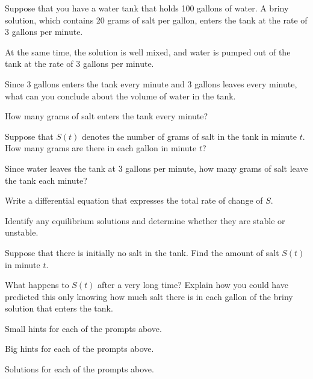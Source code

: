 \begin{activity} \label{A:7.4.salt}  
  Suppose that you have a water tank that holds 100 gallons of water.
  A briny solution, which contains 20 grams of salt per gallon, enters
  the tank at the rate of 3 gallons per minute.

  At the same time, the solution is well mixed, and water is pumped
  out of the tank at the rate of 3 gallons per minute.

\ba
\item Since 3 gallons enters the tank every minute and 3 gallons
  leaves every minute, what can you conclude about the volume of water
  in the tank.

\item How many grams of salt enters the tank every minute?

\item Suppose that $S(t)$ denotes the number of grams of salt in the
  tank in minute $t$.  How many grams are there in each gallon in
  minute $t$?

\item Since water leaves the tank at 3 gallons per minute, how many
  grams of salt leave the tank each minute? 

\item Write a differential equation that expresses the total rate of
  change of $S$.

\item Identify any equilibrium solutions and determine whether they
  are stable or unstable.

\item Suppose that there is initially no salt in the tank.  Find the
  amount of salt $S(t)$ in minute $t$.

\item What happens to $S(t)$ after a very long time?  Explain how you
  could have predicted this only knowing how much salt there is in
  each gallon of the
  briny solution that enters the tank.

\ea
\end{activity}
\begin{smallhint}
\ba
	\item Small hints for each of the prompts above.
\ea
\end{smallhint}
\begin{bighint}
\ba
	\item Big hints for each of the prompts above.
\ea
\end{bighint}
\begin{activitySolution}
\ba
	\item Solutions for each of the prompts above.
\ea
\end{activitySolution}
\aftera